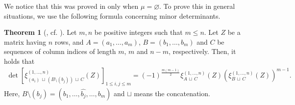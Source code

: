 \documentclass[12pt]{amsart}%
\theoremstyle{definition}
\newtheorem{theorem}{Theorem}[section]
\begin{document}
We notice that this was proved in \cite[Theorem~1.2]{nnsy} 
only when $\mu=\varnothing$.
To prove this in general situations, 
we use the following formula concerning minor determinants.

\begin{theorem}
[{\cite{b}, cf. \cite[Corollary~3.2]{o21}}]
\label{thm:Bazin}
Let $m,n$ be positive integers such that $m\le n$.
Let $Z$ be a matrix having $n$ rows,
and $A=(a_1,\ldots,a_m)$, $B=(b_1,\ldots,b_m)$ and $C$ 
be sequences of column indices of length $m$, $m$ and $n-m$, respectively. 
Then, it holds that  
\begin{align}
\label{for:Bazin}
 \det\left[\xi^{(1,\ldots,n)}_{(a_{i})\,\sqcup\,(B\setminus(b_j))\,\sqcup\, C}(Z)\right]_{1\le i,j\le m}
 =(-1)^{\frac{m(m-1)}{2}}\xi^{(1,\ldots,n)}_{A\,\sqcup\,C}(Z)\left(\xi^{(1,\ldots,n)}_{B\,\sqcup\,C}(Z)\right)^{m-1}.
\end{align}
Here, $B\setminus(b_j)=(b_1,\ldots,\widehat{b_{j}},\ldots,b_m)$
and $\sqcup$ means the concatenation. 
\end{theorem}
\end{document}
